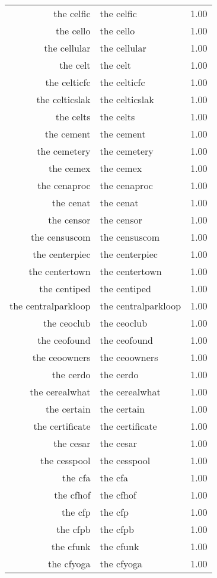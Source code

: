 \begin{table}[ht]
\begin{tabular}{rlr}
  the celfic & the celfic & 1.00 \\ 
  the cello & the cello & 1.00 \\ 
  the cellular & the cellular & 1.00 \\ 
  the celt & the celt & 1.00 \\ 
  the celticfc & the celticfc & 1.00 \\ 
  the celticslak & the celticslak & 1.00 \\ 
  the celts & the celts & 1.00 \\ 
  the cement & the cement & 1.00 \\ 
  the cemetery & the cemetery & 1.00 \\ 
  the cemex & the cemex & 1.00 \\ 
  the cenaproc & the cenaproc & 1.00 \\ 
  the cenat & the cenat & 1.00 \\ 
  the censor & the censor & 1.00 \\ 
  the censuscom & the censuscom & 1.00 \\ 
  the centerpiec & the centerpiec & 1.00 \\ 
  the centertown & the centertown & 1.00 \\ 
  the centiped & the centiped & 1.00 \\ 
  the centralparkloop & the centralparkloop & 1.00 \\ 
  the ceoclub & the ceoclub & 1.00 \\ 
  the ceofound & the ceofound & 1.00 \\ 
  the ceoowners & the ceoowners & 1.00 \\ 
  the cerdo & the cerdo & 1.00 \\ 
  the cerealwhat & the cerealwhat & 1.00 \\ 
  the certain & the certain & 1.00 \\ 
  the certificate & the certificate & 1.00 \\ 
  the cesar & the cesar & 1.00 \\ 
  the cesspool & the cesspool & 1.00 \\ 
  the cfa & the cfa & 1.00 \\ 
  the cfhof & the cfhof & 1.00 \\ 
  the cfp & the cfp & 1.00 \\ 
  the cfpb & the cfpb & 1.00 \\ 
  the cfunk & the cfunk & 1.00 \\ 
  the cfyoga & the cfyoga & 1.00 \\ 

\end{tabular}
\end{table}
